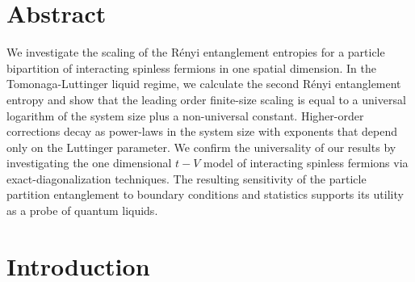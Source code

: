 

\section{Abstract}
\author{Hatem Barghathi, Emanuel Casiano-Diaz and Adrian\\ {Del Maestro}}


We investigate the scaling of the R\'{e}nyi entanglement entropies for a
particle bipartition of interacting spinless fermions in one spatial dimension. In the Tomonaga-Luttinger liquid regime, we calculate the second R\'{e}nyi
entanglement entropy and show that the leading order finite-size scaling is
equal to a universal logarithm of the system size plus a non-universal
constant.  Higher-order corrections decay as power-laws in the system size
with exponents that depend only on the Luttinger parameter. We confirm the
universality of our results by investigating the one dimensional $t-V$ model of
interacting spinless fermions via exact-diagonalization techniques.  The
resulting sensitivity of the particle partition entanglement to boundary
conditions and statistics supports its utility as a probe of quantum liquids.


\section{Introduction}

